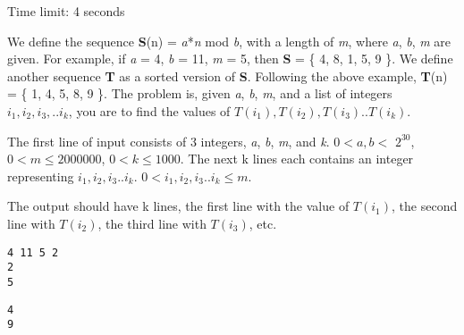 \documentclass{article}
\begin{document}

\begin{center}
Time limit: 4 seconds
\end{center}

\par We define the sequence \textbf{S}(n) = \textit{a}*\textit{n} mod
\textit{b}, with a length of \textit{m}, where \textit{a}, \textit{b},
\textit{m} are given. For example, if \textit{a} = 4, \textit{b} = 11,
\textit{m} = 5, then \textbf{S} = \{ 4, 8, 1, 5, 9 \}.  We define
another sequence \textbf{T} as a sorted version of \textbf{S}. Following the
above example, \textbf{T}(n)
= \{ 1, 4, 5, 8, 9 \}. The problem is, given \textit{a}, \textit{b}, \textit{m}, and a list of integers
$i_1,i_2,i_3,..i_k$, you are to find the values of
$T(i_1),T(i_2),T(i_3)..T(i_k)$.

\par The first line of input consists of 3 integers, \textit{a}, \textit{b},
\textit{m}, and \textit{k}. $0 < a,b
<$
$2^{30}$, $0 < m \leq 2 000 000$, $0 < k \leq 1000$. The next k lines each contains an integer
representing $i_1,i_2,i_3..i_k$. $0 < i_1,i_2,i_3..i_k \leq \textit{m}$.

\par The output should have k lines, the first line with the value of $T(i_1)$,
the second line with $T(i_2)$, the third line with $T(i_3)$, etc.

\begin{verbatim}
4 11 5 2
2
5
\end{verbatim}

\begin{verbatim}
4
9
\end{verbatim}
\end{document}
